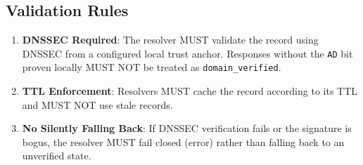 \documentclass[
]{article}
\providecommand{\tightlist}{%
  \setlength{\itemsep}{0pt}\setlength{\parskip}{0pt}}
\begin{document}
\hypertarget{validation-rules}{%
\subsection{Validation Rules}\label{validation-rules}}

\begin{enumerate}
\def\labelenumi{\arabic{enumi}.}
\tightlist
\item
  \textbf{DNSSEC Required}: The resolver MUST validate the record using
  DNSSEC from a configured local trust anchor. Responses without the
  \texttt{AD} bit proven locally MUST NOT be treated as
  \texttt{domain\_verified}.
\item
  \textbf{TTL Enforcement}: Resolvers MUST cache the record according to
  its TTL and MUST NOT use stale records.
\item
  \textbf{No Silently Falling Back}: If DNSSEC verification fails or the
  signature is bogus, the resolver MUST fail closed (error) rather than
  falling back to an unverified state.
\end{enumerate}
\end{document}
